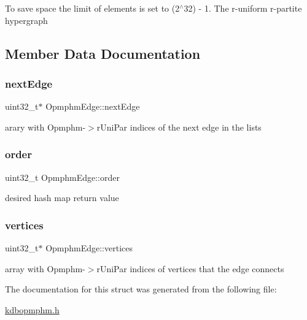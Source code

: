 To save space the limit of elements is set to (2$^\wedge$32) -\/ 1. The r-\/uniform r-\/partite hypergraph 

\subsection{Member Data Documentation}
\mbox{\label{structOpmphmEdge_a4a0e9a3d422a25a57f52530f003c3a5e}} 
\subsubsection{\texorpdfstring{next\+Edge}{nextEdge}}
{\footnotesize\ttfamily uint32\+\_\+t$\ast$ Opmphm\+Edge\+::next\+Edge}

arary with Opmphm-\/$>$r\+Uni\+Par indices of the next edge in the lists \mbox{\label{structOpmphmEdge_a0d125d2d8a97f191896b816123c09d14}} 
\subsubsection{\texorpdfstring{order}{order}}
{\footnotesize\ttfamily uint32\+\_\+t Opmphm\+Edge\+::order}

desired hash map return value \mbox{\label{structOpmphmEdge_ae8d5721fe78750b17b5d4a9b8e3fc2b2}} 
\subsubsection{\texorpdfstring{vertices}{vertices}}
{\footnotesize\ttfamily uint32\+\_\+t$\ast$ Opmphm\+Edge\+::vertices}

array with Opmphm-\/$>$r\+Uni\+Par indices of vertices that the edge connects 

The documentation for this struct was generated from the following file\+:\begin{DoxyCompactItemize}
\item 
\hyperlink{kdbopmphm_8h}{kdbopmphm.\+h}\end{DoxyCompactItemize}
